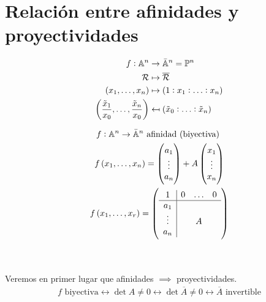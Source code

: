 \section{Relación entre afinidades y proyectividades}
\begin{minipage}[c]{0,49\textwidth}
    \begin{align*}
            f : \mathbb{A}^n &\to \bar{\mathbb{A}}^n=\mathbb{P}^n \\
            \mathcal{R} &\mapsto \overline{\mathcal{R}} \\
            \left( x_1, \ldots, x_n\right) &\mapsto \left(1:x_1:\ldots:x_n\right)\\
            \left(\frac{\tilde{x}_1}{x_0},\ldots,\frac{\tilde{x}_n}{x_0}\right) &\mapsfrom \left(\tilde{x}_0:\ldots:\tilde{x}_n\right) \\
    \end{align*}
\end{minipage}
\vline
\begin{minipage}[c]{0,49\textwidth}
    \begin{gather*}
        f : \mathbb{A}^n \to \bar{\mathbb{A}}^n  \text{  afinidad (biyectiva) }\\
        f\left( x_1,\ldots,x_n\right) = 
        \begin{pmatrix}
            a_1 \\
            \vdots \\
            a_n \\
        \end{pmatrix}
        +A
        \begin{pmatrix}
            x_1 \\
            \vdots \\
            x_n \\
        \end{pmatrix}\\
        f\left( x_1,\ldots,x_r\right) =
        \left(
        \begin{array}{c|ccc}
            1 & 0 & \ldots & 0 \\ \hline
            a_1 & & & \\
            \vdots & & A & \\
            a_n & & & 
        \end{array} \right)
    \end{gather*}
\end{minipage} \\ \\
Veremos en primer lugar que afinidades $\implies$ proyectividades.
\begin{gather*}
f\text{ biyectiva} \leftrightarrow \det A \ne 0 \leftrightarrow \det \overline{A} \ne 0 \leftrightarrow \overline{A} \text{ invertible}
\end{gather*}
